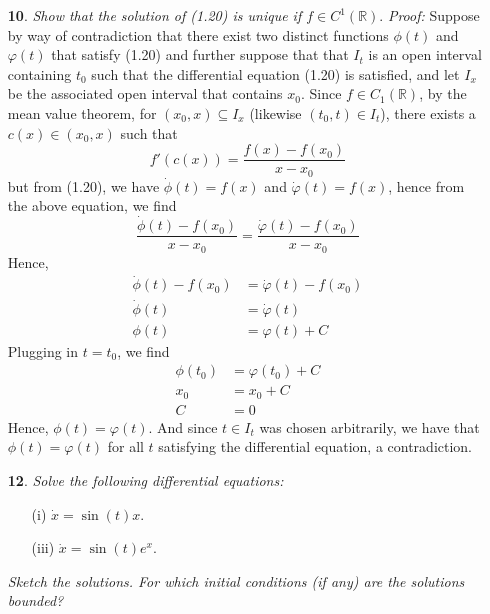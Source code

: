 \documentclass{article}
\begin{document}
\begin{itemize}
    \item[\textbf{10}.] \textit{Show that the solution of (1.20) is unique if $f \in C^1(\mathbb{R})$}.
    \newline\newline
    \textit{Proof:} Suppose by way of contradiction that there exist two distinct functions $\phi(t)$ and $\varphi(t)$ that satisfy (1.20) and further suppose that that $I_t$ is an open interval containing $t_0$ such that the differential equation (1.20) is satisfied, and let $I_x$ be the associated open interval that contains $x_0$. Since $f \in C_1(\mathbb{R})$, by the mean value theorem, for $(x_0, x) \subseteq I_x$ (likewise $(t_0,t) \in I_t$), there exists a $c(x) \in (x_0,x)$ such that
    \[f'(c(x)) = \frac{f(x) - f(x_0)}{x - x_0}\]
    but from (1.20), we have $\dot{\phi}(t) = f(x)$ and $\dot{\varphi}(t) = f(x)$, hence from the above equation, we find
    \[\frac{\dot{\phi}(t) - f(x_0)}{x - x_0} = \frac{\dot{\varphi}(t) - f(x_0)}{x - x_0}\]
    Hence,
    \begin{align*}
        \dot{\phi}(t) - f(x_0) &= \dot{\varphi}(t) - f(x_0)\\
        \dot{\phi}(t) &= \dot{\varphi}(t)\\
        \phi(t) &= \varphi(t) + C
    \end{align*}
    Plugging in $t = t_0$, we find 
    \begin{align*}
        \phi(t_0) &= \varphi(t_0) + C\\
        x_0 &= x_0 + C\\
        C &= 0
    \end{align*}
    Hence, $\phi(t) = \varphi(t)$. And since $t \in I_t$ was chosen arbitrarily, we have that $\phi(t) = \varphi(t)$ for all $t$ satisfying the differential equation, a contradiction.
    


    \item[\textbf{12}.] \textit{Solve the following differential equations:}
    \begin{itemize}
        \item[(i)] $\dot{x} = \sin(t)x$.
        \newline

        \item[(iii)] $\dot{x} = \sin(t)e^x$.
    \end{itemize}
    \textit{Sketch the solutions. For which initial conditions (if any) are the solutions bounded?}
    \newline
    

\end{itemize}
\end{document}
